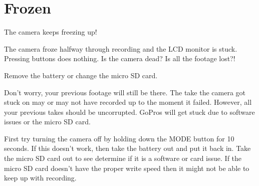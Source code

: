 \chapter{Frozen}
\pagecolor{white}
\label{chap:18}
\begin{fullwidth}


\problem

{\large The camera keeps freezing up!


 \par}

The camera froze halfway through recording and the LCD monitor is stuck. Pressing buttons does nothing. Is the camera dead? Is all the footage lost?! 


\solution

{\large Remove the battery or change the micro SD card.



 \par}

Don’t worry, your previous footage will still be there. The take the camera got stuck on may or may not have recorded up to the moment it failed. However, all your previous takes should be uncorrupted. GoPros will get stuck due to software issues or the micro SD card. 

First try turning the camera off by holding down the MODE button for 10 seconds. 
If this doesn’t work, then take the battery out and put it back in. Take the micro SD card out to see determine if it is a software or card issue. If the micro SD card doesn't have the proper write speed then it might not be able to keep up with recording. 






\clearpage
\end{fullwidth}
